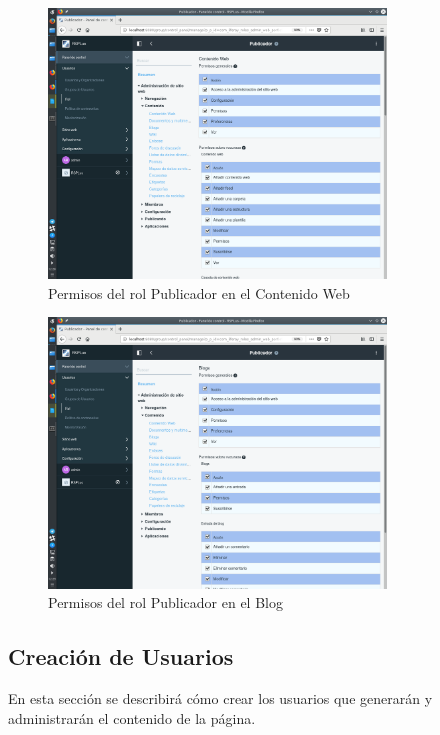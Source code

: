 \begin{figure}[H]
\begin{center}
\includegraphics[width=0.8\textwidth]{./img/liferay/18.png}
\end{center}
\caption{Permisos del rol Publicador en el Contenido Web}
\label{img:lr18}
\end{figure}

\begin{figure}[H]
\begin{center}
\includegraphics[width=0.8\textwidth]{./img/liferay/19.png}
\end{center}
\caption{Permisos del rol Publicador en el Blog}
\label{img:lr19}
\end{figure}


\subsection{Creación de Usuarios}
\par En esta sección se describirá cómo crear los usuarios que generarán y administrarán el contenido de la página.
